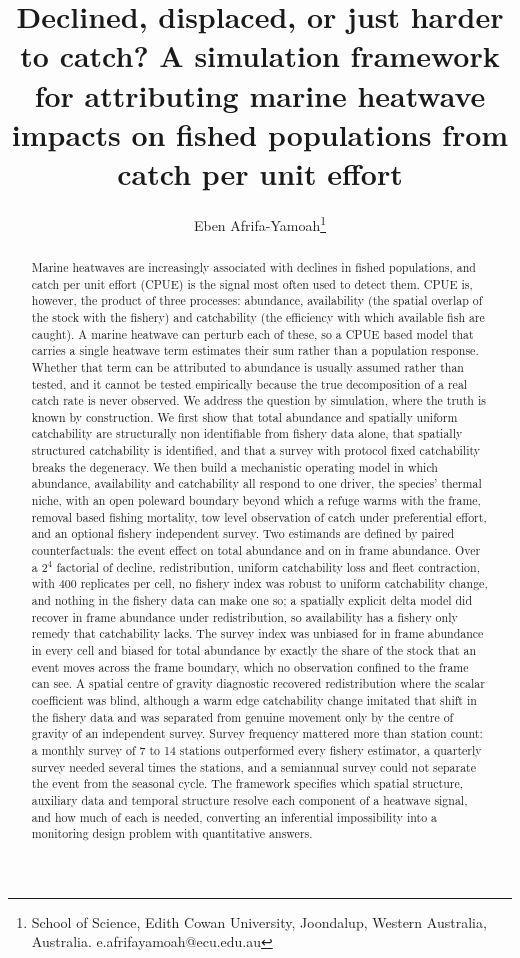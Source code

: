 \documentclass[
  11pt,
  a4paper,
]{article}
\title{Declined, displaced, or just harder to catch? A simulation
framework for attributing marine heatwave impacts on fished populations
from catch per unit effort}
\author{Eben
Afrifa-Yamoah\thanks{School of Science, Edith Cowan University, Joondalup, Western Australia, Australia. e.afrifayamoah@ecu.edu.au}}
\date{}
\begin{document}
\maketitle
\begin{abstract}
Marine heatwaves are increasingly associated with declines in fished
populations, and catch per unit effort (CPUE) is the signal most often
used to detect them. CPUE is, however, the product of three processes:
abundance, availability (the spatial overlap of the stock with the
fishery) and catchability (the efficiency with which available fish are
caught). A marine heatwave can perturb each of these, so a CPUE based
model that carries a single heatwave term estimates their sum rather
than a population response. Whether that term can be attributed to
abundance is usually assumed rather than tested, and it cannot be tested
empirically because the true decomposition of a real catch rate is never
observed. We address the question by simulation, where the truth is
known by construction. We first show that total abundance and spatially
uniform catchability are structurally non identifiable from fishery data
alone, that spatially structured catchability is identified, and that a
survey with protocol fixed catchability breaks the degeneracy. We then
build a mechanistic operating model in which abundance, availability and
catchability all respond to one driver, the species' thermal niche, with
an open poleward boundary beyond which a refuge warms with the frame,
removal based fishing mortality, tow level observation of catch under
preferential effort, and an optional fishery independent survey. Two
estimands are defined by paired counterfactuals: the event effect on
total abundance and on in frame abundance. Over a \(2^{4}\) factorial of
decline, redistribution, uniform catchability loss and fleet
contraction, with 400 replicates per cell, no fishery index was robust
to uniform catchability change, and nothing in the fishery data can make
one so; a spatially explicit delta model did recover in frame abundance
under redistribution, so availability has a fishery only remedy that
catchability lacks. The survey index was unbiased for in frame abundance
in every cell and biased for total abundance by exactly the share of the
stock that an event moves across the frame boundary, which no
observation confined to the frame can see. A spatial centre of gravity
diagnostic recovered redistribution where the scalar coefficient was
blind, although a warm edge catchability change imitated that shift in
the fishery data and was separated from genuine movement only by the
centre of gravity of an independent survey. Survey frequency mattered
more than station count: a monthly survey of 7 to 14 stations
outperformed every fishery estimator, a quarterly survey needed several
times the stations, and a semiannual survey could not separate the event
from the seasonal cycle. The framework specifies which spatial
structure, auxiliary data and temporal structure resolve each component
of a heatwave signal, and how much of each is needed, converting an
inferential impossibility into a monitoring design problem with
quantitative answers.


\end{abstract}
\end{document}
